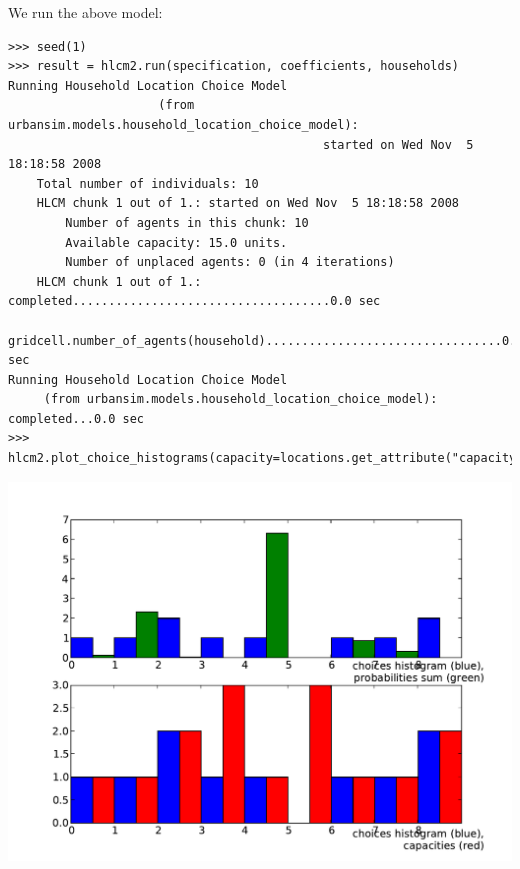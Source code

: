 We run the above model:
\begin{verbatim}
>>> seed(1)
>>> result = hlcm2.run(specification, coefficients, households)
Running Household Location Choice Model 
                     (from urbansim.models.household_location_choice_model): 
                                            started on Wed Nov  5 18:18:58 2008
    Total number of individuals: 10
    HLCM chunk 1 out of 1.: started on Wed Nov  5 18:18:58 2008
        Number of agents in this chunk: 10
        Available capacity: 15.0 units.
        Number of unplaced agents: 0 (in 4 iterations)
    HLCM chunk 1 out of 1.: completed....................................0.0 sec
    gridcell.number_of_agents(household).................................0.0 sec
Running Household Location Choice Model 
     (from urbansim.models.household_location_choice_model): completed...0.0 sec
>>> hlcm2.plot_choice_histograms(capacity=locations.get_attribute("capacity"))
\end{verbatim}
\begin{center}
\includegraphics[scale=0.5, angle=0]{images/hlcm2hist.pdf}
\end{center}

